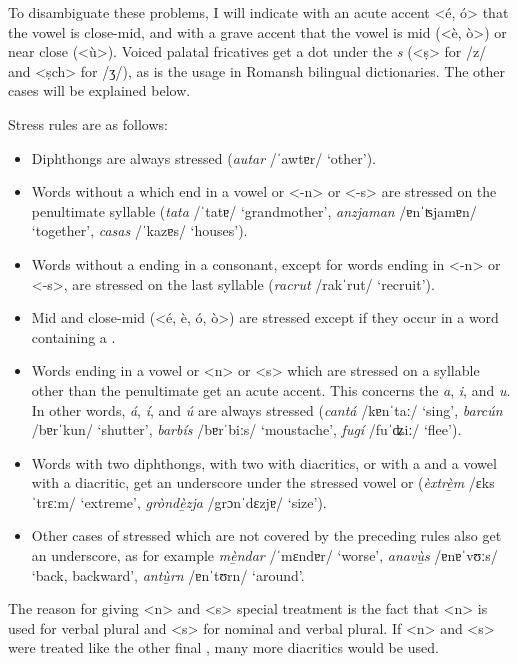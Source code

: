 To disambiguate these problems, I will indicate with an acute accent <é, ó> that the vowel is close-mid, and with a grave accent that the vowel is mid (<è, ò>) or near close (<ù>). Voiced palatal fricatives get a dot under the \textit{s} (<ṣ> for /z/ and <ṣch> for /ʒ/), as is the usage in Romansh bilingual dictionaries. The other cases will be explained below.

Stress rules are as follows:

\begin{itemize}
	\item Diphthongs are always stressed (\textit{autar} /ˈawtɐr/ `other').
	\item Words without a  which end in a vowel or <-n> or <-s> are stressed on the penultimate syllable (\textit{tata} /ˈtatɐ/ `grandmother', \textit{anzjaman} /ɐnˈʦjamɐn/ `together', \textit{casas} /ˈkazɐs/ `houses').
	\item Words without a  ending in a consonant, except for words ending in <-n> or <-s>, are stressed on the last syllable (\textit{racrut} /rakˈrut/ `recruit').
	\item Mid and close-mid  (<é, è, ó, ò>) are stressed except if they occur in a word containing a .
	\item Words ending in a vowel or <n> or <s> which are stressed on a syllable other than the penultimate get an acute accent. This concerns the  \textit{a}, \textit{i}, and \textit{u}. In other words, \textit{á}, \textit{í}, and \textit{ú} are always stressed (\textit{cantá} /kɐnˈtaː/ `sing', \textit{barcún} /bɐrˈkun/ `shutter', \textit{barbís} /bɐrˈbiːs/ `moustache', \textit{fugí} /fuˈʥiː/ `flee').
	\item Words with two diphthongs, with two  with diacritics, or with a  and a vowel with a diacritic, get an underscore under the stressed vowel or  (\textit{èxtrè̱m} /ɛksˈtrɛːm/ `extreme', \textit{gròndè̱zja} /grɔnˈdɛzjɐ/ `size').
	\item Other cases of stressed  which are not covered by the preceding rules also get an underscore, as for example \textit{mè̱ndar} /ˈmɛndɐr/ `worse', \textit{anavù̱s} /ɐnɐˈvʊːs/ `back, backward', \textit{antù̱rn} /ɐnˈtʊrn/ `around'.
\end{itemize}


The reason for giving <n> and <s> special treatment is the fact that <n> is used for verbal plural and <s> for nominal and verbal plural. If <n> and <s> were treated like the other final , many more diacritics would be used.


